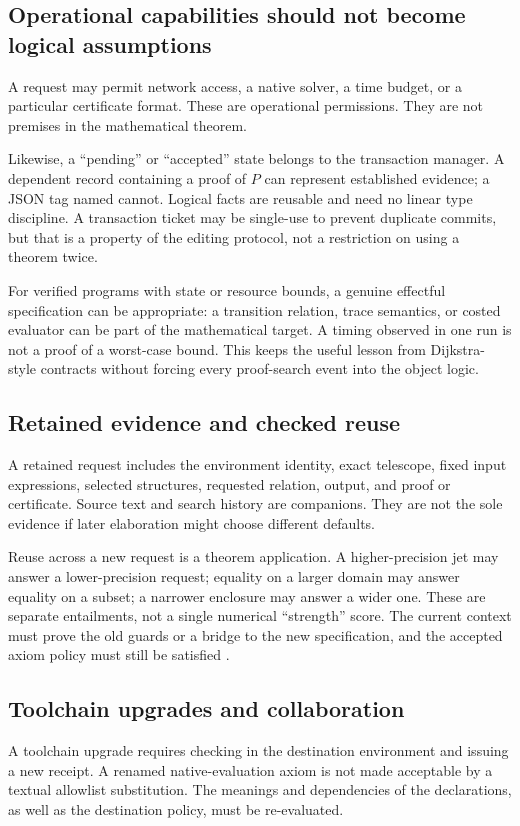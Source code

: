 \documentclass[11pt,letterpaper]{article}
\theoremstyle{definition}\newtheorem{definition}[theorem]{Definition}
\newcommand{\code}[1]{\texttt{\detokenize{#1}}}
\begin{document}
\subsection{Operational capabilities should not become logical assumptions}
A request may permit network access, a native solver, a time budget, or a particular certificate format. These are operational permissions. They are not premises in the mathematical theorem.

Likewise, a ``pending'' or ``accepted'' state belongs to the transaction manager. A dependent record containing a proof of $P$ can represent established evidence; a JSON tag named \code{proved} cannot. Logical facts are reusable and need no linear type discipline. A transaction ticket may be single-use to prevent duplicate commits, but that is a property of the editing protocol, not a restriction on using a theorem twice.

For verified programs with state or resource bounds, a genuine effectful specification can be appropriate: a transition relation, trace semantics, or costed evaluator can be part of the mathematical target. A timing observed in one run is not a proof of a worst-case bound. This keeps the useful lesson from Dijkstra-style contracts without forcing every proof-search event into the object logic.

\subsection{Retained evidence and checked reuse}
A retained request includes the environment identity, exact telescope, fixed input expressions, selected structures, requested relation, output, and proof or certificate. Source text and search history are companions. They are not the sole evidence if later elaboration might choose different defaults.

Reuse across a new request is a theorem application. A higher-precision jet may answer a lower-precision request; equality on a larger domain may answer equality on a subset; a narrower enclosure may answer a wider one. These are separate entailments, not a single numerical ``strength'' score. The current context must prove the old guards or a bridge to the new specification, and the accepted axiom policy must still be satisfied \cite{reportA,reportB}.

\subsection{Toolchain upgrades and collaboration}
A toolchain upgrade requires checking in the destination environment and issuing a new receipt. A renamed native-evaluation axiom is not made acceptable by a textual allowlist substitution. The meanings and dependencies of the declarations, as well as the destination policy, must be re-evaluated.
\end{document}
